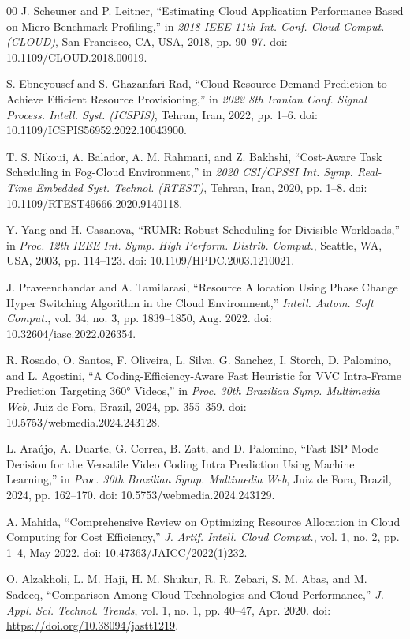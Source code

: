 \documentclass[conference]{IEEEtran}
\begin{document}
\begin{thebibliography}{00}
 J. Scheuner and P. Leitner, ``Estimating Cloud Application
Performance Based on Micro-Benchmark Profiling,'' in \emph{2018 IEEE 11th
Int. Conf. Cloud Comput. (CLOUD)}, San Francisco, CA, USA, 2018, pp. 90--97.
doi: 10.1109/CLOUD.2018.00019.

 S. Ebneyousef and S. Ghazanfari-Rad, ``Cloud Resource Demand
Prediction to Achieve Efficient Resource Provisioning,'' in \emph{2022 8th
Iranian Conf. Signal Process. Intell. Syst. (ICSPIS)}, Tehran, Iran, 2022,
pp. 1--6. doi: 10.1109/ICSPIS56952.2022.10043900.

 T. S. Nikoui, A. Balador, A. M. Rahmani, and Z. Bakhshi,
``Cost-Aware Task Scheduling in Fog-Cloud Environment,'' in \emph{2020
CSI/CPSSI Int. Symp. Real-Time Embedded Syst. Technol. (RTEST)}, Tehran,
Iran, 2020, pp. 1--8. doi: 10.1109/RTEST49666.2020.9140118.

 Y. Yang and H. Casanova, ``RUMR: Robust Scheduling for Divisible
Workloads,'' in \emph{Proc. 12th IEEE Int. Symp. High Perform. Distrib.
Comput.}, Seattle, WA, USA, 2003, pp. 114--123.
doi: 10.1109/HPDC.2003.1210021.

 J. Praveenchandar and A. Tamilarasi, ``Resource Allocation Using
Phase Change Hyper Switching Algorithm in the Cloud Environment,''
\emph{Intell. Autom. Soft Comput.}, vol. 34, no. 3, pp. 1839--1850,
Aug. 2022. doi: 10.32604/iasc.2022.026354.

 R. Rosado, O. Santos, F. Oliveira, L. Silva, G. Sanchez,
I. Storch, D. Palomino, and L. Agostini, ``A Coding-Efficiency-Aware Fast
Heuristic for VVC Intra-Frame Prediction Targeting 360° Videos,'' in
\emph{Proc. 30th Brazilian Symp. Multimedia Web}, Juiz de Fora, Brazil, 2024,
pp. 355--359. doi: 10.5753/webmedia.2024.243128.

 L. Araújo, A. Duarte, G. Correa, B. Zatt, and D. Palomino,
``Fast ISP Mode Decision for the Versatile Video Coding Intra Prediction Using
Machine Learning,'' in \emph{Proc. 30th Brazilian Symp. Multimedia Web},
Juiz de Fora, Brazil, 2024, pp. 162--170. doi: 10.5753/webmedia.2024.243129.

 A. Mahida, ``Comprehensive Review on Optimizing Resource
Allocation in Cloud Computing for Cost Efficiency,'' \emph{J. Artif. Intell.
Cloud Comput.}, vol. 1, no. 2, pp. 1--4, May 2022.
doi: 10.47363/JAICC/2022(1)232.

 O. Alzakholi, L. M. Haji, H. M. Shukur, R. R. Zebari,
S. M. Abas, and M. Sadeeq, ``Comparison Among Cloud Technologies and Cloud
Performance,'' \emph{J. Appl. Sci. Technol. Trends}, vol. 1, no. 1,
pp. 40--47, Apr. 2020. doi: \url{https://doi.org/10.38094/jastt1219}.


\end{thebibliography}
\end{document}
